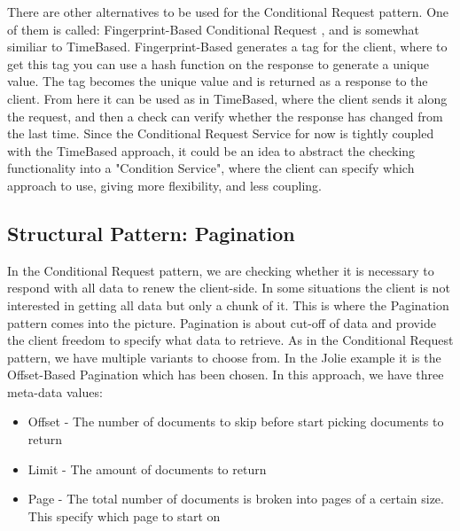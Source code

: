 \documentclass[12pt]{article}
\begin{document}
There are other alternatives to be used for the Conditional Request pattern. One of them is called: Fingerprint-Based Conditional Request \cite{CondReqRFC}, and is somewhat similiar to TimeBased. Fingerprint-Based generates a tag for the client, where to get this tag you can use a hash function on the response to generate a unique value. The tag becomes the unique value and is returned as a response to the client. From here it can be used as in TimeBased, where the client sends it along the request, and then a check can verify whether the response has changed from the last time. Since the Conditional Request Service for now is tightly coupled with the TimeBased approach, it could be an idea to abstract the checking functionality into a "Condition Service", where the client can specify which approach to use, giving more flexibility, and less coupling.\\

\subsection{Structural Pattern: Pagination}
In the Conditional Request pattern, we are checking whether it is necessary to respond with all data to renew the client-side. In some situations the client is not interested in getting all data but only a chunk of it. This is where the Pagination pattern \cite{PaginationMAPI} comes into the picture. Pagination is about cut-off of data and provide the client freedom to specify what data to retrieve. As in the Conditional Request pattern, we have multiple variants to choose from. In the Jolie example it is the Offset-Based Pagination which has been chosen. In this approach, we have three meta-data values: 

\begin{itemize}
    \item Offset - The number of documents to skip before start picking documents to return
    \item Limit - The amount of documents to return
    \item Page - The total number of documents is broken into pages of a certain size. This specify which page to start on
\end{itemize}
\end{document}
